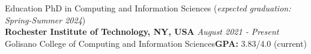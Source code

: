 \documentclass[10pt]{resume} %
\begin{document}
\begin{rSection}{Education}
PhD in Computing and Information Sciences (\textit{expected graduation: Spring-Summer 2024}) \\
{\bf Rochester Institute of Technology, NY, USA} \hfill \small{\em August 2021 - Present}\normalsize\\ 
Golisano College of Computing and Information Sciences\hfill \small\textbf{GPA:} 3.83/4.0 (current)\normalsize\\

\end{rSection}
\end{document}
